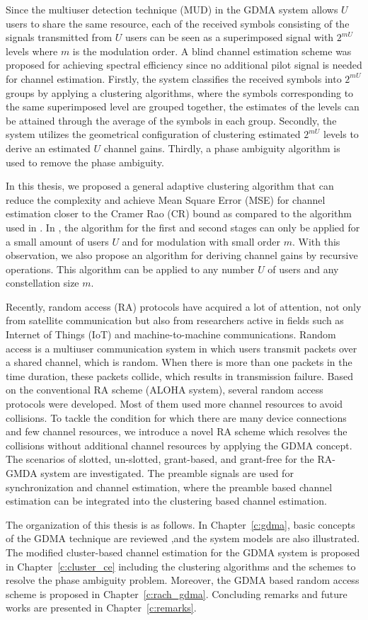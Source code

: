 Since the multiuser detection technique (MUD) in the GDMA system allows $U$ users to share the same resource, each of the received symbols consisting of the signals transmitted from $U$ users can be seen as a superimposed signal with $2^{mU}$ levels where $m$ is the modulation order. A blind channel estimation scheme\cite{yt19} was proposed for achieving spectral efficiency since no additional pilot signal is needed for channel estimation. Firstly, the system classifies the received symbols into $2^{mU}$ groups by applying a clustering algorithms\cite{lbg80}\cite{kmpp07}\cite{em77}, where the symbols corresponding to the same superimposed level are grouped together, the estimates of the levels can be attained through the average of the symbols in each group. Secondly, the system utilizes the geometrical configuration of clustering estimated $2^{mU}$ levels to derive an estimated $U$ channel gains. Thirdly, a phase ambiguity algorithm is used to remove the phase ambiguity. 
  
In this thesis, we proposed a general adaptive clustering algorithm that can reduce the complexity and achieve Mean Square Error (MSE) for channel estimation closer to the Cramer Rao (CR) bound as compared to the algorithm used in \cite{yt19}.  In \cite{yt19}, the algorithm for the first and second stages can only be applied for a small amount of users $U$ and for modulation with small order $m$. With this observation, we also propose an algorithm for deriving channel gains by recursive operations. This algorithm can be applied to any number $U$ of users and any constellation size $m$.

Recently, random access (RA) protocols have acquired a lot of attention, not only from satellite communication but also from researchers active in fields such as Internet of Things (IoT) and machine-to-machine communications. Random access is a multiuser communication system in which users transmit packets over a shared channel, which is random. When there is more than one packets in the time duration, these packets collide, which results in transmission failure. Based on the conventional RA scheme (ALOHA system), several random access protocols were developed.  Most of them used more channel resources to avoid collisions.  To tackle the condition for which there are many device connections and few channel resources, we introduce a novel RA scheme which resolves the collisions without additional channel resources by applying the GDMA concept. The scenarios of slotted, un-slotted, grant-based, and grant-free for the RA-GMDA system are investigated. The preamble signals are used for synchronization and channel estimation, where the preamble based channel estimation can be integrated into the clustering based channel estimation. 


The organization of this thesis is as follows. In Chapter~\ref{c:gdma}, basic concepts of the GDMA technique are reviewed ,and the system models are also illustrated. The modified cluster-based channel estimation for the GDMA system is proposed in Chapter~\ref{c:cluster_ce} including the clustering algorithms and the schemes to resolve the phase ambiguity problem. Moreover, the GDMA based random access scheme is proposed in Chapter~\ref{c:rach_gdma}. Concluding remarks and future works are presented in Chapter~\ref{c:remarks}.
